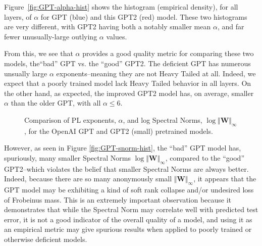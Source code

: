 Figure~\ref{fig:GPT-alpha-hist} shows the histogram (empirical density), for all layers, of $\alpha$ for GPT (blue) and this GPT2 (red) model.  
These two histograms are very different, with GPT2 having both a notably smaller mean $\alpha$, and far fewer unusually-large outlying $\alpha$ values.

From this, we see that $\alpha$ provides a good quality metric for comparing these two models, the``bad'' GPT vs. the ``good'' GPT2.
The deficient GPT has numerous unsually large $\alpha$ exponents--meaning they are not Heavy Tailed at all.
Indeed, we expect that a poorly trained model lack Heavy Tailed behavior in all layers.
On the other hand, as expected, the improved GPT2 model has, on average, smaller $\alpha$ than the older GPT, with all $\alpha\le6$.  

\begin{figure}
    \centering
   \caption{Comparison of PL exponents, $\alpha$, and log Spectral Norms, $\log\Vert\mathbf{W}\Vert_{\infty}$, for the OpenAI GPT and GPT2 (small) pretrained models.}
\label{fig:GPT-hist}
\end{figure}

However, as seen in Figure \ref{fig:GPT-snorm-hist},
the ``bad'' GPT model has, spuriously, many smaller Spectral Norms $\log\Vert\mathbf{W}\Vert_{\infty}$,
compared to the ``good'' GPT2--which violates the belief that smaller Spectral Norms are always better.
Indeed, because there are so many anonymously small $\Vert\mathbf{W}\Vert_{\infty}$,
it appears that the GPT model may be exhibiting a kind of soft rank collapse and/or undesired
loss of Frobeinus mass.
This is an extremely important observation because it demonstrates that while the Spectral Norm
may correlate well with predicted test error, it is not a good indicator of the overall quality of a model,
and using it as an empirical metric may give spurious results when applied to poorly trained
or otherwise deficient models. 

